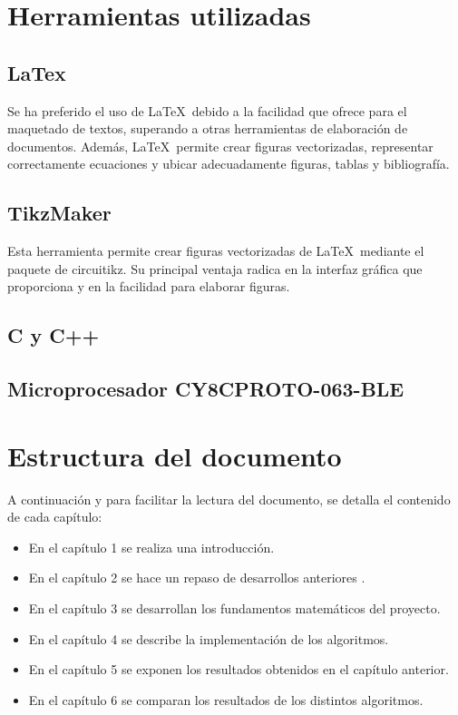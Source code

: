 \section{Herramientas utilizadas}
\subsection{LaTex \cite{latex}} 
Se ha preferido el uso de \LaTeX\ debido a la facilidad que ofrece para el maquetado de textos, superando a otras herramientas de elaboración de documentos. Además, \LaTeX\ permite crear figuras vectorizadas, representar correctamente ecuaciones y ubicar adecuadamente figuras, tablas y bibliografía.
\subsection{TikzMaker \cite{tikzmaker}} 
Esta herramienta permite crear figuras vectorizadas de \LaTeX\ mediante el paquete de circuitikz. Su principal ventaja radica en la interfaz gráfica que proporciona y en la facilidad para elaborar figuras.

\subsection{C \cite{ISO_C} y C++ \cite{ISO_CPP}}

\subsection{Microprocesador CY8CPROTO-063-BLE \cite{CY8CPROTO063BLE}}

\section{Estructura del documento}
A continuación y para facilitar la lectura del documento, se detalla el contenido de cada capítulo:

\begin{itemize}
	\item En el capítulo 1 se realiza una introducción.
	\item En el capítulo 2 se hace un repaso de desarrollos anteriores .
	\item En el capítulo 3 se desarrollan los fundamentos matemáticos del proyecto.
	\item En el capítulo 4 se describe la implementación de los algoritmos.
	\item En el capítulo 5 se exponen los resultados obtenidos en el capítulo anterior. 
	\item En el capítulo 6 se comparan los resultados de los distintos algoritmos.
\end{itemize}
